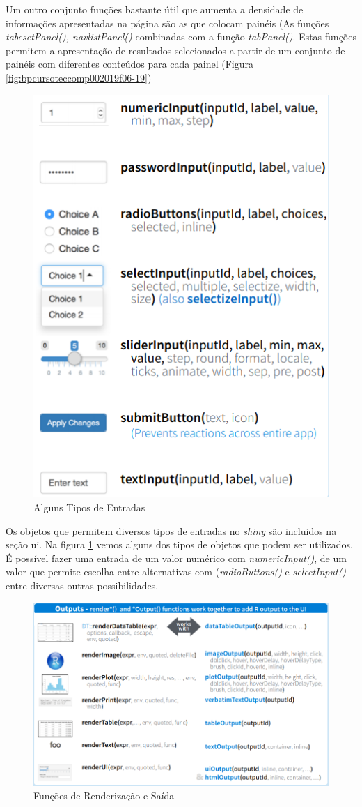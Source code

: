 \documentclass[12pt,a4paper,oneside]{erdc}
\begin{document}
Um outro conjunto funções bastante útil que aumenta a densidade de informações apresentadas na página são as que colocam painéis (As funções \textit{tabesetPanel(), navlistPanel()} combinadas com a função \textit{tabPanel()}. Estas funções permitem a apresentação de resultados selecionados a partir de um conjunto de painéis com diferentes conteúdos para cada painel (Figura \ref{fig:bpcursoteccomp002019f06-19})


\begin{figure}
	\centering
	\includegraphics[width=0.7\linewidth]{../figs/BP_Curso_TecComp_00_2019_f06-12}
	\caption{Alguns Tipos de Entradas}
	\label{fig:bpcursoteccomp002019f06-12}
\end{figure}

Os objetos que permitem diversos tipos de entradas no \textit{shiny} são incluidos na seção ui. Na figura \ref{fig:bpcursoteccomp002019f06-12} vemos alguns dos tipos de objetos que podem ser utilizados. É possível fazer uma entrada de um valor numérico com \textit{numericInput()}, de um valor que permite escolha entre alternativas com (\textit{radioButtons()} e \textit{selectInput()}  entre diversas outras possibilidades.



\begin{figure}[htpb]
	\centering
	\includegraphics[width=0.7\linewidth]{../figs/BP_Curso_TecComp_00_2019_f06-20}
	\caption{Funções de Renderização e Saída}
	\label{fig:bpcursoteccomp002019f06-20}
\end{figure}
\end{document}
